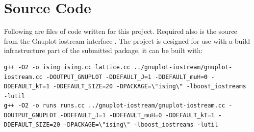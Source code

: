 \documentclass[12pt,a4paper,english]{article}
\begin{document}



\newpage
\appendix

\section{Source Code}
\label{sec:source-code}

Following are files of code written for this project. Required also is the source from the Gnuplot iostream interface \cite{gnuplot-iostream}.  The project is designed for use with a build infrastructure part of the submitted package, it can be built with:
\begin{lstlisting}
g++ -O2 -o ising ising.cc lattice.cc ../gnuplot-iostream/gnuplot-iostream.cc -DOUTPUT_GNUPLOT -DDEFAULT_J=1 -DDEFAULT_muH=0 -DDEFAULT_kT=1 -DDEFAULT_SIZE=20 -DPACKAGE=\"ising\" -lboost_iostreams -lutil
g++ -O2 -o runs runs.cc ../gnuplot-iostream/gnuplot-iostream.cc -DOUTPUT_GNUPLOT -DDEFAULT_J=1 -DDEFAULT_muH=0 -DDEFAULT_kT=1 -DDEFAULT_SIZE=20 -DPACKAGE=\"ising\" -lboost_iostreams -lutil
\end{lstlisting}

\lstset{language=C++}




\end{document}
